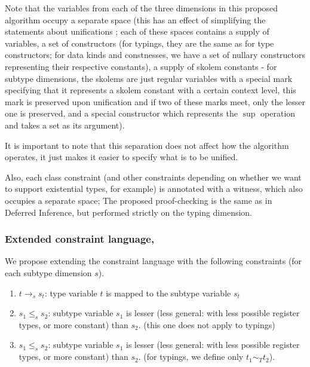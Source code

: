 Note that the variables from each of the three dimensions in this proposed algorithm occupy a separate space (this has an effect of simplifying the statements about unifications ; each of these spaces contains a supply of variables, a set of constructors (for typings, they are the same as for type constructors; for data kinds and constnesses, we have a set of nullary constructors representing their respective constants), a supply of skolem constants - for subtype dimensions, the skolems are just regular variables with a special mark specifying that it represents a skolem constant with a certain context level, this mark is preserved upon unification and if two of these marks meet, only the lesser one is preserved, and a special constructor which represents the $\sup$ operation and takes a set as its argument).

\begin{remark}
    It is important to note that this separation does not affect how the algorithm operates, it just makes it easier to specify what is to be unified.
\end{remark}

Also, each class constraint (and other constraints depending on whether we want to support existential types, for example) is annotated with a witness, which also occupies a separate space; The proposed proof-checking is the same as in Deferred Inference, but performed strictly on the typing dimension.

\subsubsection{Extended constraint language, }

We propose extending the constraint language with the following constraints (for each subtype dimension $s$).

\begin{enumerate}
    \item $t \to_s s_t$: type variable $t$ is mapped to the subtype variable $s_t$

    \item $s_1 \leq_s s_2$: subtype variable $s_1$ is lesser (less general: with less possible register types, or more constant) than $s_2$. (this one does not apply to typings)

    \item $s_1 \leq_s s_2$: subtype variable $s_1$ is lesser (less general: with less possible register types, or more constant) than $s_2$. (for typings, we define only $t_1 \sim_T t_2$).
\end{enumerate}

